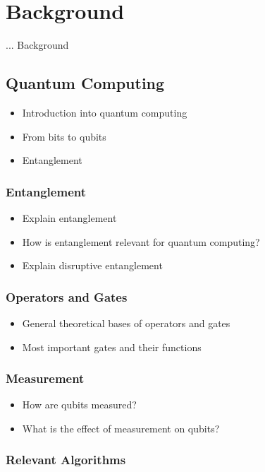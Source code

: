 \chapter{Background}
... Background

\section{Quantum Computing}
\begin{itemize}
    \item Introduction into quantum computing
    \item From bits to qubits
    \item Entanglement
\end{itemize}

\subsection{Entanglement}
\begin{itemize}
    \item Explain entanglement
    \item How is entanglement relevant for quantum computing?
    \item Explain disruptive entanglement
\end{itemize}

\subsection{Operators and Gates}
\begin{itemize}
    \item General theoretical bases of operators and gates
    \item Most important gates and their functions
\end{itemize}

\subsection{Measurement}
\begin{itemize}
    \item How are qubits measured?
    \item What is the effect of measurement on qubits?
\end{itemize}

\subsection{Relevant Algorithms}


